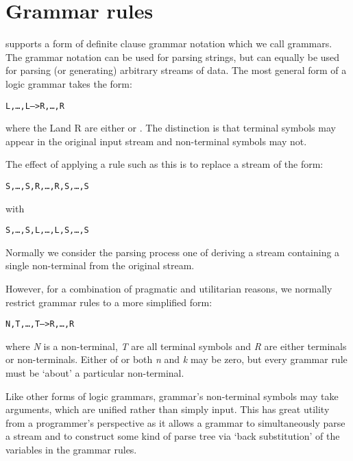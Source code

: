 \chapter{Grammar rules}
\label{grammars}

\go supports a form of definite clause grammar notation which we call \go grammars. The grammar notation can be used for parsing strings, but can equally be used for parsing (or generating) arbitrary streams of data.
The most general form of a logic grammar takes the form:
\begin{alltt}
L,\ldots,L\subn --> R,\ldots,R
\end{alltt}
where the L\subi and R are either  or . The distinction is that terminal symbols may appear in the original input stream and non-terminal symbols may not.

The effect of applying a rule such as this is to replace a stream of the form:
\begin{alltt}
S,\ldots,S,R,\ldots,R,S,\ldots,S
\end{alltt}
with
\begin{alltt}
S,\ldots,S,L,\ldots,L\subn,S,\ldots,S
\end{alltt}
Normally we consider the parsing process one of deriving a stream containing a single non-terminal from the original stream.

However, for a combination of pragmatic and utilitarian reasons, we normally restrict grammar rules to a more simplified form:
\begin{alltt}
N,T,\ldots,T\subn --> R,\ldots,R
\end{alltt}
where \emph{N} is a non-terminal, \emph{T\subi} are all terminal symbols and \emph{R} are either terminals or non-terminals. Either of or both \emph{n} and \emph{k} may be zero, but every grammar rule must be `about' a particular non-terminal.

Like other forms of logic grammars, \go grammar's non-terminal symbols may take arguments, which are unified rather than simply input. This has great utility from a programmer's perspective as it allows a grammar to simultaneously parse a stream and to construct some kind of parse tree via `back substitution' of the variables in the grammar rules.

